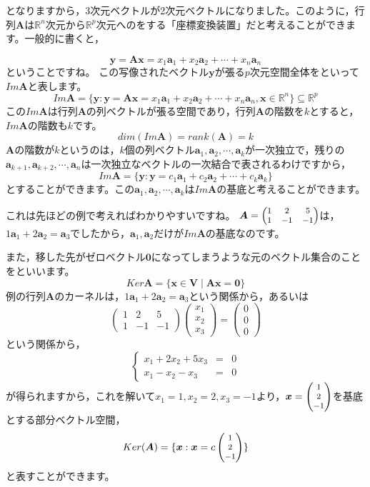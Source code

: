 \documentclass{ltjsbook}
\begin{document}
となりますから，3次元ベクトルが2次元ベクトルになりました。このように，行列$\bm{A}$は$\mathbb{R}^n$次元から$\mathbb{R}^p$次元へのをする「座標変換装置」だと考えることができます。一般的に書くと，

\[ \bm{y} = \bm{Ax} = x_1\bm{a}_1 + x_2\bm{a}_2 + \cdots + x_n\bm{a}_n \]
ということですね。
この写像されたベクトル$\bm{y}$が張る$p$次元空間全体をといって$Im \bm{A}$と表します。
\[ Im \bm{A} = \{ \bm{y} : \bm{y} =\bm{Ax} = x_1\bm{a}_1 + x_2\bm{a}_2 + \cdots + x_n\bm{a}_n,\bm{x}\in \mathbb{R}^n \} \subseteq \mathbb{R}^p \]
この$Im \bm{A}$は行列$\bm{A}$の列ベクトルが張る空間であり，行列$\bm{A}$の階数を$k$とすると，$Im \bm{A}$の階数も$k$です。
\[ dim(Im \bm{A}) = rank(\bm{A}) = k \]
$\bm{A}$の階数が$k$というのは，$k$個の列ベクトル$\bm{a}_1,\bm{a}_2,\cdots,\bm{a}_k$が一次独立で，残りの$\bm{a}_{k+1},\bm{a}_{k+2},\cdots,\bm{a}_n$は一次独立なベクトルの一次結合で表されるわけですから，
\[ Im \bm{A} = \{ \bm{y}:\bm{y} = c_1\bm{a}_1+c_2\bm{a}_2+\cdots+c_k\bm{a}_k \} \]
とすることができます。この$\bm{a}_1,\bm{a}_2,\cdots,\bm{a}_k$は$Im\bm{A}$の基底と考えることができます。

これは先ほどの例で考えればわかりやすいですね。
$\bm{A}=\footnotesize\begin{pmatrix}1&2&5\\1&-1&-1\end{pmatrix}$は，$1\bm{a}_1+2\bm{a}_2 = \bm{a}_3$でしたから，$\bm{a}_1,\bm{a}_2$だけが$Im\bm{A}$の基底なのです。

また，移した先がゼロベクトル$\bm{0}$になってしまうような元のベクトル集合のことをといいます。
\[ Ker \bm{A} = \{ \bm{x} \in \bm{V}\mid \bm{Ax}=\bm{0}\} \]
例の行列$\bm{A}$のカーネルは，$1\bm{a}_1+2\bm{a}_2 = \bm{a}_3$という関係から，あるいは
\[ \begin{pmatrix}1&2&5\\1&-1&-1\end{pmatrix}\begin{pmatrix}x_1\\x_2\\x_3\end{pmatrix} = \begin{pmatrix}0\\0\\0\end{pmatrix} \]
という関係から，
\[
	\left \{
	\begin{array}{ccc}
		x_1+2x_2+5x_3 & = & 0 \\
		x_1-x_2-x_3   & = & 0
	\end{array}
	\right .
\]
が得られますから，これを解いて$x_1=1,x_2=2,x_3=-1$より，$\bm{x} =\footnotesize \begin{pmatrix}1\\2\\-1\end{pmatrix}$を基底とする部分ベクトル空間，
\[ Ker(\bm{A}) = \{ \bm{x}:\bm{x} = c\footnotesize\begin{pmatrix}1\\2\\-1\end{pmatrix} \} \]
と表すことができます。
\end{document}

